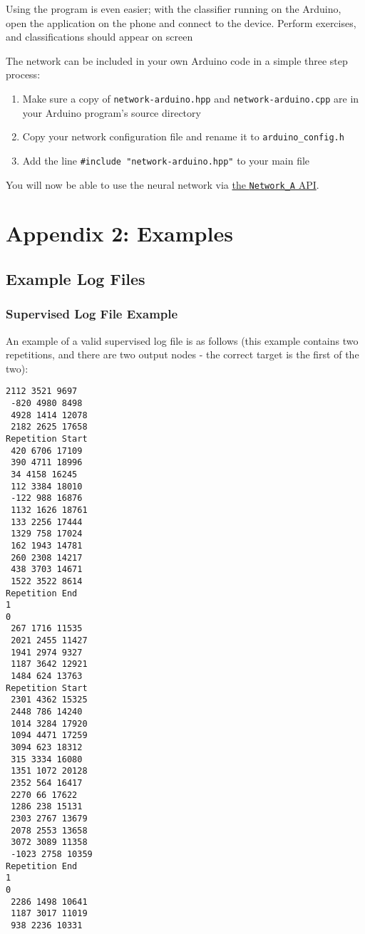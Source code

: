 \documentclass[a4paper]{article}
\begin{document}
Using the program is even easier; with the classifier running on the Arduino, open the application on the phone and connect to the device. Perform exercises, and classifications should appear on screen

The network can be included in your own Arduino code in a simple three step process:

\begin{enumerate}
\item Make sure a copy of \lstinline{network-arduino.hpp} and \lstinline{network-arduino.cpp} are in your Arduino program's source directory
\item Copy your network configuration file and rename it to \lstinline{arduino_config.h}
\item Add the line \lstinline{#include "network-arduino.hpp"} to your main file
\end{enumerate}

You will now be able to use the neural network via \hyperref[subsec:dn_API_networka]{the \lstinline{Network_A} API}.

\section{Appendix 2: Examples}
\label{sec:a2}

\subsection{Example Log Files}%
\label{subsec:a2_lf}

\subsubsection{Supervised Log File Example}
\label{subsubsec:a2_lf_supervised}

An example of a valid supervised log file is as follows (this example contains two repetitions, and there are two output nodes - the correct target is the first of the two):

\begin{lstlisting}
2112 3521 9697
 -820 4980 8498
 4928 1414 12078
 2182 2625 17658
Repetition Start
 420 6706 17109
 390 4711 18996
 34 4158 16245
 112 3384 18010
 -122 988 16876
 1132 1626 18761
 133 2256 17444
 1329 758 17024
 162 1943 14781
 260 2308 14217
 438 3703 14671
 1522 3522 8614
Repetition End
1
0
 267 1716 11535
 2021 2455 11427
 1941 2974 9327
 1187 3642 12921
 1484 624 13763
Repetition Start
 2301 4362 15325
 2448 786 14240
 1014 3284 17920
 1094 4471 17259
 3094 623 18312
 315 3334 16080
 1351 1072 20128
 2352 564 16417
 2270 66 17622
 1286 238 15131
 2303 2767 13679
 2078 2553 13658
 3072 3089 11358
 -1023 2758 10359
Repetition End
1
0
 2286 1498 10641
 1187 3017 11019
 938 2236 10331
\end{lstlisting}
\end{document}
